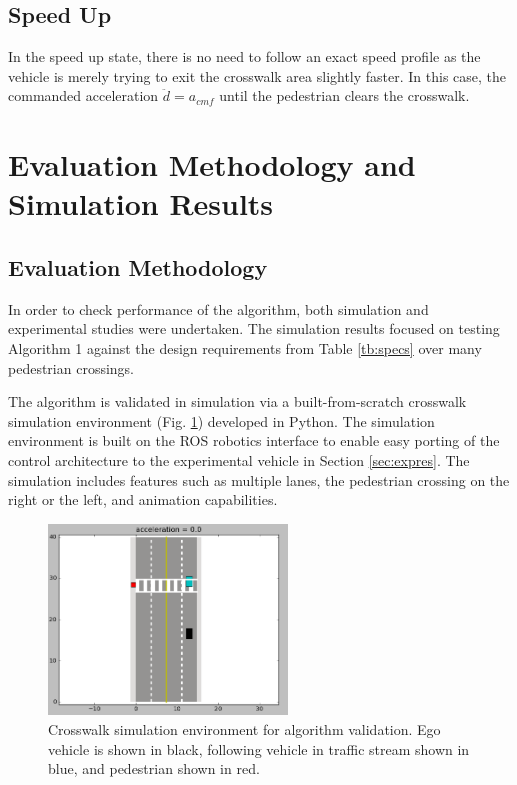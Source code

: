 \documentclass[letterpaper, 10 pt, conference]{ieeeconf}  %
\begin{document}
\subsection{Speed Up}

In the speed up state, there is no need to follow an exact speed profile as the vehicle is merely trying to exit the crosswalk area slightly faster. In this case, the commanded acceleration $\ddot{d} = a_{cmf}$ until the pedestrian clears the crosswalk. 

\section{Evaluation Methodology and Simulation Results}

\subsection{Evaluation Methodology}

In order to check performance of the algorithm, both simulation and experimental studies were undertaken. The simulation results focused on testing Algorithm 1 against the design requirements from Table \ref{tb:specs} over many pedestrian crossings. 

The algorithm is validated in simulation via a built-from-scratch crosswalk simulation environment (Fig. \ref{fig:simFramework}) developed in Python. The simulation environment is built on the ROS \cite{ROS} robotics interface to enable easy porting of the control architecture to the experimental vehicle in Section \ref{sec:expres}. The simulation includes features such as multiple lanes, the pedestrian crossing on the right or the left, and animation capabilities.    

\begin{figure}
\centering
\includegraphics[width=2.5in]{figures/simFramework.png}
\caption{Crosswalk simulation environment for algorithm validation. Ego vehicle is shown in black, following vehicle in traffic stream shown in blue, and pedestrian shown in red.}
\label{fig:simFramework}
\end{figure}
\end{document}

